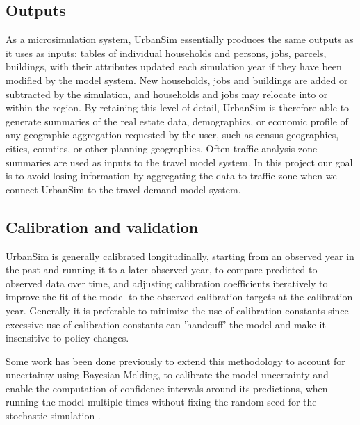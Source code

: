 


\subsection{Outputs}

As a microsimulation system, UrbanSim essentially produces the same outputs as it uses as inputs: tables of individual households and persons, jobs, parcels, buildings, with their attributes updated each simulation year if they have been modified by the model system.  New households, jobs and buildings are added or subtracted by the simulation, and households and jobs may relocate into or within the region.  By retaining this level of detail, UrbanSim is therefore able to generate summaries of the real estate data, demographics, or economic profile of any geographic aggregation requested by the user, such as census geographies, cities, counties, or other planning geographies.  Often traffic analysis zone summaries are used as inputs to the travel model system.  In this project our goal is to avoid losing information by aggregating the data to traffic zone when we connect UrbanSim to the travel demand model system.


\subsection{Calibration and validation}

UrbanSim is generally calibrated longitudinally, starting from an observed year in the past and running it to a later observed year, to compare predicted to observed data over time, and adjusting calibration coefficients iteratively to improve the fit of the model to the observed calibration targets at the calibration year.  Generally it is preferable to minimize the use of calibration constants since excessive use of calibration constants can 'handcuff' the model and make it insensitive to policy changes.

Some work has been done previously to extend this methodology to account for uncertainty using Bayesian Melding, to calibrate the model uncertainty and enable the computation of confidence intervals around its predictions, when running the model multiple times without fixing the random seed for the stochastic simulation \citep{sevcikova-tra-2009, sevcikova-tra-2011}.  